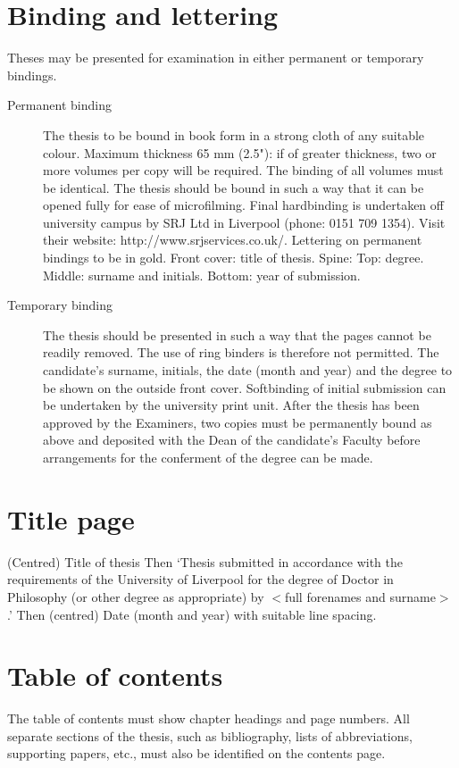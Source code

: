 \section{Binding and lettering}
Theses may be presented for examination in either permanent or temporary 
bindings. 
\begin{description}
\item[Permanent binding]
The thesis to be bound in book form in a strong cloth of any suitable 
colour. Maximum thickness 65 mm (2.5"): if of greater thickness, two or 
more volumes per copy will be required. The binding of all volumes must 
be identical. The thesis should be bound in such a way that it can be 
opened fully for ease of microfilming. Final hardbinding is undertaken off 
university campus by SRJ Ltd in Liverpool (phone: 0151 709 1354). Visit 
their website: http://www.srjservices.co.uk/.
Lettering on permanent bindings to be in gold. Front cover: title of thesis. 
Spine: Top: degree. Middle: surname and initials. Bottom: year of 
submission.
\item[Temporary binding]
The thesis should be presented in such a way that the pages cannot be 
readily removed. The use of ring binders is therefore not permitted. The 
candidate's surname, initials, the date (month and year) and the degree to 
be shown on the outside front cover. Softbinding of initial submission can 
be undertaken by the university print unit.
After the thesis has been approved by the Examiners, two copies must be 
permanently bound as above and deposited with the Dean of the 
candidate's Faculty before arrangements for the conferment of the degree 
can be made.
\end{description}

\section{Title page}
(Centred) Title of thesis
Then `Thesis submitted in accordance with the requirements of the 
University of Liverpool for the degree of Doctor in Philosophy (or other 
degree as appropriate) by $<$full forenames and surname$>$.'
Then (centred) Date (month and year) with suitable line spacing.

\section{Table of contents}
The table of contents must show chapter headings and page numbers. All 
separate sections of the thesis, such as bibliography, lists of abbreviations, 
supporting papers, etc., must also be identified on the contents page.

